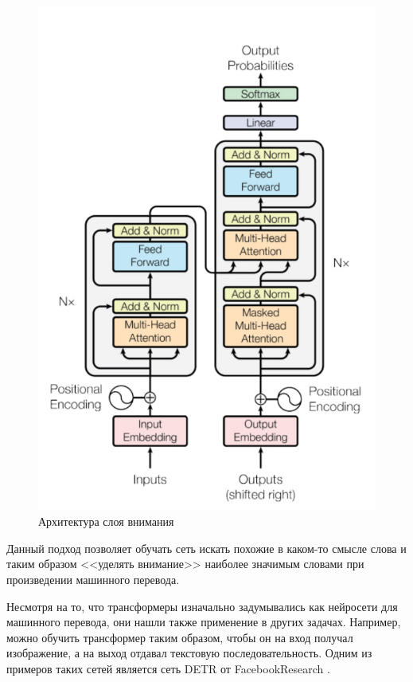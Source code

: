 \begin{figure}[h!] 
	\center
	\includegraphics [scale=0.6] {my_folder/images/transformer}
	\caption{Архитектура слоя внимания} 
	\label{fig:attention}
\end{figure}

Данный подход позволяет обучать сеть искать похожие в каком-то смысле слова и таким образом <<уделять внимание>> наиболее значимым словами при произведении машинного перевода. 

Несмотря на то, что трансформеры изначально задумывались как нейросети для машинного перевода, они нашли также применение в других задачах. Например, можно обучить трансформер таким образом, чтобы он на вход получал изображение, а на выход отдавал текстовую последовательность.
Одним из примеров таких сетей является сеть DETR от FacebookResearch \cite{detr}.

